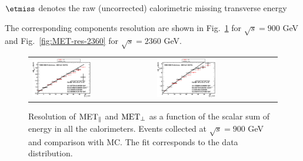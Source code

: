  $\etmiss$ denotes the raw (uncorrected) calorimetric missing
 transverse energy
 
The corresponding components resolution are  shown in 
 Fig.~\ref{fig:MET-res-900} for $\sqrt{s}=900$ GeV  and
 Fig.~\ref{fig:MET-res-2360} for $\sqrt{s}=2360$ GeV.

\begin{figure}[h!]
 \centering
 \begin{tabular}{ll}
   \includegraphics[width=0.5\textwidth]{plots_DataVsMC_MB_900GeV/DATA_METpar_TT_sigma_900.eps} &
    \includegraphics[width=0.5\textwidth]{plots_DataVsMC_MB_900GeV/DATA_METperp_TT_sigma_900.eps} \\
\end{tabular}
\caption{ Resolution of $\rm{MET}_{\parallel}$ and ${\rm
    MET}_{\perp}$  as a function of the scalar sum of energy in all
  the calorimeters. Events collected at $\sqrt{s}=900$ GeV and
  comparison with MC. The fit corresponds to the data distribution.
  \label{fig:MET-res-900}}
\end{figure}

